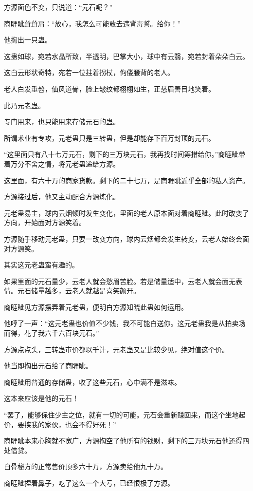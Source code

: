\begin{this_body}
方源面色不变，只说道：“元石呢？”

商睚眦耸耸肩：“放心，我怎么可能敢去违背毒誓。给你！”

他掏出一只蛊。

这蛊如球，宛若水晶所致，半透明，巴掌大小，球中有云翳，宛若封着朵朵白云。

这白云形状奇特，宛若一位拄着拐杖，佝偻腰背的老人。

老人白发垂髫，仙风道骨，脸上皱纹都栩栩如生，正慈眉善目地笑着。

此乃元老蛊。

专门用来，也只能用来存储元石的蛊。

所谓术业有专攻，元老蛊只是三转蛊，但是却能存下百万封顶的元石。

“这里面只有八十七万元石，剩下的三万块元石，我再找时间筹措给你。”商睚眦带着万分不舍之情，将元老蛊递给方源。

这里面，有六十万的商家货款。剩下的二十七万，是商睚眦近乎全部的私人资产。

方源接过后，他又主动配合方源炼化。

元老蛊易主，球内云烟顿时发生变化，里面的老人原本面对着商睚眦。此时改变了方向，开始面对方源笑着。

方源随手移动元老蛊，只要一改变方向，球内云烟都会发生转变，云老人始终会面对方源笑。

其实这元老蛊蛮有趣的。

如果里面的元石量少，云老人就会愁眉苦脸。若是储量适中，云老人就会面无表情。元石储量越多，云老人就越是喜笑颜开。

商睚眦见方源摆弄着元老蛊，便明白方源知晓此蛊如何运用。

他哼了一声：“这元老蛊也价值不少钱，我不可能白送你。这元老蛊我是从拍卖场而得，花了我六千六百块元石。”

方源点点头，三转蛊市价都以千计，元老蛊又是比较少见，绝对值这个价。

他当即掏出元石给了商睚眦。

商睚眦用普通的存储蛊，收了这些元石，心中满不是滋味。

这本来应该是他的元石！

“罢了，能够保住少主之位，就有一切的可能。元石会重新赚回来，而这个坐地起价，要挟我的家伙，也会不得好死！”

商睚眦本来心胸就不宽广，方源掏空了他所有的钱财，剩下的三万块元石他还得四处借贷。

白骨秘方的正常售价顶多六十万，方源卖给他九十万。

商睚眦捏着鼻子，吃了这么一个大亏，已经恨极了方源。


\end{this_body}
